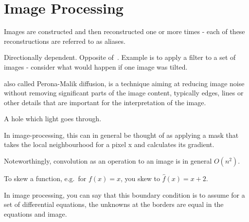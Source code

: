 \section{Image Processing}

\begin{definition}[Aliasing]
    Images are constructed and then reconstructed one or more times - 
    each of these reconstructions are referred to as aliases.
\end{definition}

\begin{definition}[Anisotropy]\label{anisotropy}
    Directionally dependent. Opposite of~.
    Example is to apply a filter to a set of images - consider
    what would happen if one image was tilted.
\end{definition}

\begin{definition}
    also called Perona-Malik diffusion, is a technique aiming at reducing image
    noise without removing significant parts of the image content, typically
    edges, lines or other details that are important for the interpretation of
    the image.

\end{definition}

\begin{definition}[Aperture]
    A hole which light goes through.
\end{definition}

\begin{definition}[Convolution]\label{convolution}
    In image-processing, this can in general be thought of as applying a mask
    that takes the local neighbourhood for a pixel x and calculates its
    gradient.

    Noteworthingly, convolution as an operation to an image is in general
    $O(n^{2})$.
\end{definition}

\begin{definition}
    To skew a function, e.g.\ for $f(x) = x$, you skew to $\hat{f}(x) = x + 2$.
\end{definition}

\begin{definition}
    In image processing, you can say that this boundary condition is to assume
    for a set of differential equations, the unknowns at the borders are 
    equal in the equations and image.

\end{definition}


